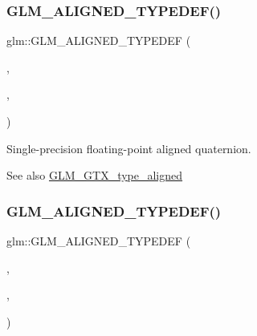 \subsubsection{\texorpdfstring{G\+L\+M\+\_\+\+A\+L\+I\+G\+N\+E\+D\+\_\+\+T\+Y\+P\+E\+D\+E\+F()}{GLM\_ALIGNED\_TYPEDEF()}\hspace{0.1cm}{\footnotesize\ttfamily [205/209]}}
{\footnotesize\ttfamily glm\+::\+G\+L\+M\+\_\+\+A\+L\+I\+G\+N\+E\+D\+\_\+\+T\+Y\+P\+E\+D\+EF (\begin{DoxyParamCaption}\item[{\hyperlink{fwd_8hpp_ac1f6a5957091b849730ea6f05a6b7ad6}{quat}}]{,  }\item[{aligned\+\_\+quat}]{,  }\item[{16}]{ }\end{DoxyParamCaption})}

Single-\/precision floating-\/point aligned quaternion. \begin{DoxySeeAlso}{See also}
\hyperlink{group__gtx__type__aligned}{G\+L\+M\+\_\+\+G\+T\+X\+\_\+type\+\_\+aligned} 
\end{DoxySeeAlso}
\mbox{\label{group__gtx__type__aligned_gad8c4bfacff70e57dc8303634c8bfce35}} 
\subsubsection{\texorpdfstring{G\+L\+M\+\_\+\+A\+L\+I\+G\+N\+E\+D\+\_\+\+T\+Y\+P\+E\+D\+E\+F()}{GLM\_ALIGNED\_TYPEDEF()}\hspace{0.1cm}{\footnotesize\ttfamily [206/209]}}
{\footnotesize\ttfamily glm\+::\+G\+L\+M\+\_\+\+A\+L\+I\+G\+N\+E\+D\+\_\+\+T\+Y\+P\+E\+D\+EF (\begin{DoxyParamCaption}\item[{\hyperlink{fwd_8hpp_aa95d73f08018f3864c6ae08dbf1c59f2}{fquat}}]{,  }\item[{aligned\+\_\+fquat}]{,  }\item[{16}]{ }\end{DoxyParamCaption})}

